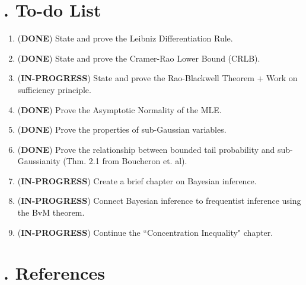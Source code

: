 \newpage

\listoftheorems[ignoreall,show=dfn]

\setcounter{section}{2}


\newpage\section{. To-do List}
\newcommand{\DONE}{(\color{green}\textbf{DONE}\color{black}) }
\newcommand{\NOTDONE}{(\color{red}\textbf{IN-PROGRESS}\color{black}) }
\begin{enumerate}
	\item \DONE State and prove the Leibniz Differentiation Rule.
	\item \DONE State and prove the Cramer-Rao Lower Bound (CRLB).
	\item \NOTDONE State and prove the Rao-Blackwell Theorem + Work on sufficiency principle.
	\item \DONE Prove the Asymptotic Normality of the MLE.
	\item \DONE Prove the properties of sub-Gaussian variables.
	\item \DONE Prove the relationship between bounded tail probability and sub-Gaussianity (Thm. 2.1 from Boucheron et. al).
	\item \NOTDONE Create a brief chapter on Bayesian inference.
	\item \NOTDONE Connect Bayesian inference to frequentist inference using the BvM theorem.
	\item \NOTDONE Continue the ``Concentration Inequality" chapter.
\end{enumerate} 

\newpage
\section{. References}
\nocite{*}
\printbibliography